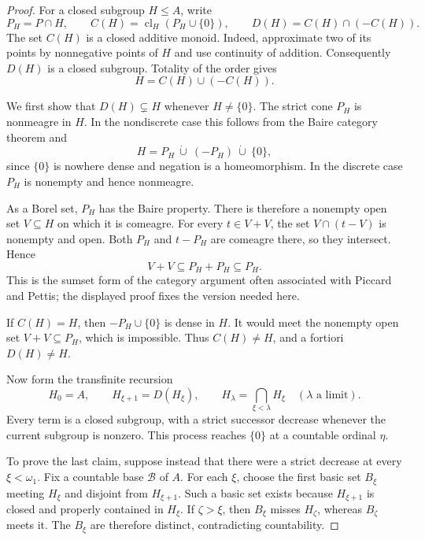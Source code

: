 \documentclass[11pt]{article}
\numberwithin{equation}{section}
\theoremstyle{definition}
\theoremstyle{remark}
\newcommand{\cl}{\operatorname{cl}}
\begin{document}
\begin{proof}
For a closed subgroup $H\leq A$, write
\[
P_H=P\cap H,\qquad
C(H)=\cl_H(P_H\cup\{0\}),\qquad
D(H)=C(H)\cap(-C(H)).
\]
The set $C(H)$ is a closed additive monoid. Indeed, approximate two of its
points by nonnegative points of $H$ and use continuity of addition.
Consequently $D(H)$ is a closed subgroup. Totality of the order gives
\begin{equation}
\label{pma:cp:eq:coneunion}
H=C(H)\cup(-C(H)).
\end{equation}

We first show that $D(H)\subsetneq H$ whenever $H\ne\{0\}$. The strict
cone $P_H$ is nonmeagre in $H$. In the nondiscrete case this follows from
the Baire category theorem and
\[
H=P_H\ \dot\cup\ (-P_H)\ \dot\cup\ \{0\},
\]
since $\{0\}$ is nowhere dense and negation is a homeomorphism. In the
discrete case $P_H$ is nonempty and hence nonmeagre.

As a Borel set, $P_H$ has the Baire property. There is therefore a nonempty
open set $V\subseteq H$ on which it is comeagre. For every $t\in V+V$,
the set $V\cap(t-V)$ is nonempty and open. Both $P_H$ and $t-P_H$ are
comeagre there, so they intersect. Hence
\begin{equation}
\label{pma:cp:eq:sumsetinterior}
V+V\subseteq P_H+P_H\subseteq P_H.
\end{equation}
This is the sumset form of the category argument often associated with
Piccard and Pettis; the displayed proof fixes the version needed here.

If $C(H)=H$, then $-P_H\cup\{0\}$ is dense in $H$. It would meet the
nonempty open set $V+V\subseteq P_H$, which is impossible. Thus
$C(H)\ne H$, and a fortiori $D(H)\ne H$.

Now form the transfinite recursion
\begin{equation}
\label{pma:cp:eq:conerecursion}
H_0=A,\qquad H_{\xi+1}=D(H_\xi),\qquad
H_\lambda=\bigcap_{\xi<\lambda}H_\xi
\quad(\lambda\text{ a limit}).
\end{equation}
Every term is a closed subgroup, with a strict successor decrease whenever
the current subgroup is nonzero. This process reaches $\{0\}$ at a
countable ordinal $\eta$.

To prove the last claim, suppose instead that there were a strict decrease
at every $\xi<\omega_1$. Fix a countable base $\mathcal B$ of $A$.
For each $\xi$, choose the first basic set $B_\xi$ meeting $H_\xi$ and
disjoint from $H_{\xi+1}$. Such a basic set exists because
$H_{\xi+1}$ is closed and properly contained in $H_\xi$.
If $\zeta>\xi$, then $B_\xi$ misses $H_\zeta$, whereas $B_\zeta$ meets
it. The $B_\xi$ are therefore distinct, contradicting countability.


\end{proof}
\end{document}

